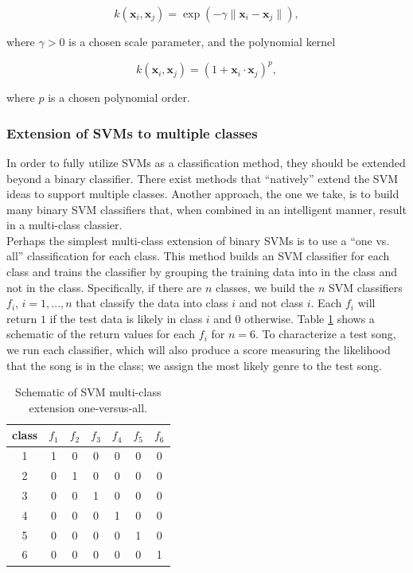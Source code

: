 \documentclass[12pt]{article}
\begin{document}
\[ k(\mathbf{x}_i,\mathbf{x}_j) = \exp\left(-\gamma \|\mathbf{x}_i-\mathbf{x}_j\|\right), \] 

\noindent where $\gamma>0$ is a chosen scale parameter, and the polynomial kernel

\[ k(\mathbf{x}_i,\mathbf{x}_j) = \left(1+\mathbf{x}_i\cdot\mathbf{x}_j\right)^p, \] 

\noindent where $p$ is a chosen polynomial order.\\

\subsubsection{Extension of SVMs to multiple classes}
In order to fully utilize SVMs as a classification method, they should be extended beyond a binary classifier.  There exist methods that ``natively'' extend the SVM ideas to support multiple classes.  Another approach, the one we take, is to build many binary SVM classifiers that, when combined in an intelligent manner, result in a multi-class classier.\\ 

Perhaps the simplest multi-class extension of binary SVMs is to use a ``one vs. all'' classification for each class.  This method builds an SVM classifier for each class and trains the classifier by grouping the training data into in the class and not in the class.  Specifically, if there are $n$ classes, we build the $n$ SVM classifiers $f_i$, $i=1,...,n$ that classify the data into class $i$ and not class $i$.  Each $f_i$ will return $1$ if the test data is likely in class $i$ and $0$ otherwise.  Table \ref{tab:onevall} shows a schematic of the return values for each $f_i$ for $n=6$.  To characterize a test song, we run each classifier, which will also produce a score measuring the likelihood that the song is in the class; we assign the most likely genre to the test song.\\

\begin{table}[h!]
   \centering
   \begin{tabular}{|c|cccccc|}
      \hline
      class&$f_1$ & $f_2$ & $f_3$ & $f_4$ & $f_5$ & $f_6$\\\hline
      1 & 1 & 0 & 0 & 0 &0 &0\\\hline
      2 & 0 & 1 & 0 & 0 & 0 & 0\\\hline
      3 & 0 & 0 & 1 & 0 & 0 & 0\\\hline
      4 & 0 & 0 & 0 & 1 & 0 & 0\\\hline
      5 & 0 & 0 & 0 & 0 & 1 & 0\\\hline
      6 & 0 & 0 & 0 & 0 & 0 & 1\\\hline
   \end{tabular}
   \caption{Schematic of SVM multi-class extension one-versus-all.}
   \label{tab:onevall}
\end{table}
\end{document}
